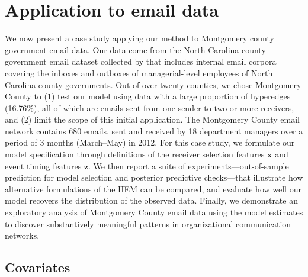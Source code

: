\documentclass[ba]{imsart}
\numberwithin{equation}{section}
\theoremstyle{plain}
\begin{document}
	\section{Application to email data}\label{sec:Emails}
	We now present a case study applying our method to Montgomery county government email data.
	Our data come from the North Carolina county government email dataset collected by \cite{ben2017transparency} that includes internal email corpora covering the inboxes and outboxes of managerial-level employees of North Carolina county governments. Out of over twenty counties, we chose Montgomery County to (1) test our model using data with a large proportion of hyperedges (16.76\%), all of which are emails sent from one sender to two or more receivers, and (2) limit the scope of this initial application. The Montgomery County email network contains 680 emails, sent and received by 18 department managers over a period of 3 months (March--May) in 2012. For this case study,
	we formulate our model specification through definitions of the receiver selection features $\boldsymbol{x}$ and event timing features $\boldsymbol{z}$. We then report a suite of experiments---out-of-sample prediction for model selection and posterior predictive checks---that illustrate how alternative formulations of the HEM can be compared, and evaluate how well our model recovers the distribution of the observed data. Finally, we demonstrate an exploratory analysis of Montgomery County email data using the model estimates to discover substantively meaningful patterns in organizational communication networks.
	\subsection{Covariates}\label{subsec:Covariates_email}
\end{document}
